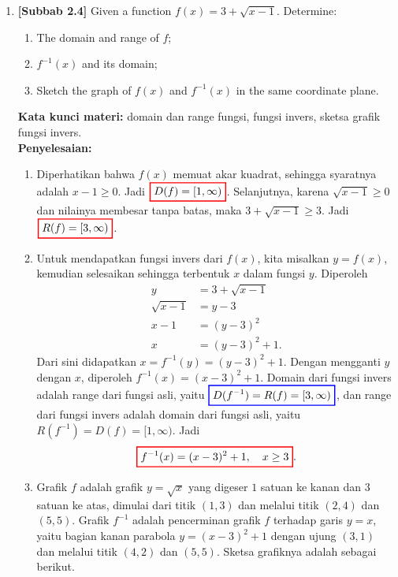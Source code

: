 \documentclass[10pt,openany,a4paper]{article}
\theoremstyle{definition}
\theoremstyle{definition}
\theoremstyle{plain}
\newenvironment{jawab}[2][tes]{%
\par\noindent\textbf{Kata kunci materi:} #1.\\
\textbf{Penyelesaian:} #2%
}{}
\begin{document}
\begin{enumerate}
    \item \textbf{[Subbab 2.4]} Given a function $f(x)=3+\sqrt{x-1}$. Determine:
    \begin{enumerate}
        \item[a)] The domain and range of $f$;
        \item[b)] $f^{-1}(x)$ and its domain;
        \item[c)] Sketch the graph of $f(x)$ and $f^{-1}(x)$ in the same coordinate plane.
    \end{enumerate}
    \begin{jawab}[domain dan range fungsi, fungsi invers, sketsa grafik fungsi invers]{
        \begin{enumerate}
            \item Diperhatikan bahwa $f(x)$ memuat akar kuadrat, sehingga syaratnya adalah $x-1\geq 0$. Jadi $\colorlet{oldcolor}{.}
        \color{red}
        \setlength{\fboxrule}{1pt} \boxed{\color{oldcolor}D(f)=[1,\infty)}\color{oldcolor}$. Selanjutnya, karena $\sqrt{x-1}\geq 0$ dan nilainya membesar tanpa batas, maka $3+\sqrt{x-1}\geq 3$. Jadi $\colorlet{oldcolor}{.}
        \color{red}
        \setlength{\fboxrule}{1pt} \boxed{\color{oldcolor}R(f)=[3,\infty)}\color{oldcolor}$.
            \item Untuk mendapatkan fungsi invers dari $f(x)$, kita misalkan $y=f(x)$, kemudian selesaikan sehingga terbentuk $x$ dalam fungsi $y$. Diperoleh
            \begin{align*}
                y &= 3+\sqrt{x-1}\\
                \sqrt{x-1} &= y-3\\
                x-1 &= (y-3)^2\\
                x &= (y-3)^2+1.
            \end{align*}
            Dari sini didapatkan $x = f^{-1}(y) = (y-3)^2+1$. Dengan mengganti $y$ dengan $x$, diperoleh $f^{-1}(x)=(x-3)^2+1$. Domain dari fungsi invers adalah range dari fungsi asli, yaitu $\colorlet{oldcolor}{.}
        \color{blue}
        \setlength{\fboxrule}{1pt} \boxed{\color{oldcolor}D(f^{-1})=R(f)=[3,\infty)}\color{oldcolor}$, dan range dari fungsi invers adalah domain dari fungsi asli, yaitu $R(f^{-1})=D(f)=[1,\infty)$. Jadi
            \begin{align*}
                \colorlet{oldcolor}{.}
        \color{red}
        \setlength{\fboxrule}{1pt} \boxed{\color{oldcolor}f^{-1}(x)=(x-3)^2+1,\quad x\geq 3}\color{oldcolor}.
            \end{align*}
            \item Grafik $f$ adalah grafik $y=\sqrt{x}$ yang digeser $1$ satuan ke kanan dan $3$ satuan ke atas, dimulai dari titik $(1,3)$ dan melalui titik $(2,4)$ dan $(5,5)$. Grafik $f^{-1}$ adalah pencerminan grafik $f$ terhadap garis $y=x$, yaitu bagian kanan parabola $y=(x-3)^2+1$ dengan ujung $(3,1)$ dan melalui titik $(4,2)$ dan $(5,5)$. Sketsa grafiknya adalah sebagai berikut.

\end{enumerate}}
\end{jawab}
\end{enumerate}
\end{document}
